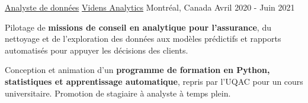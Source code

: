 \begin{cventries}
  \cventry
    {\href{https://www.videns.ai/}{Analyste de données}}
    {\href{https://www.videns.ai/}{Videns Analytics}}
    {Montréal, Canada}
    {Avril 2020 - Juin 2021}
    {
      \begin{cvitems}
        \item{Pilotage de \textbf{missions de conseil en analytique pour l'assurance}, du nettoyage et de l'exploration des données aux modèles prédictifs et rapports automatisés pour appuyer les décisions des clients.}
        \item{Conception et animation d'un \textbf{programme de formation en Python, statistiques et apprentissage automatique}, repris par l'UQAC pour un cours universitaire. Promotion de stagiaire à analyste à temps plein.}
      \end{cvitems}
    }
\end{cventries}
